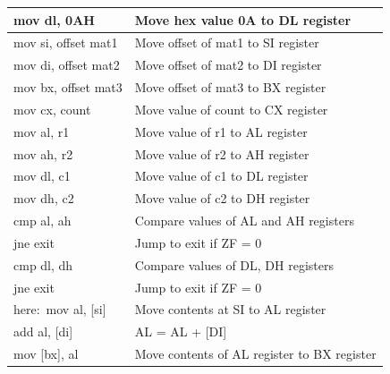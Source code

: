 \documentclass[10pt,a4paper]{article}
\begin{document}
\begin{flushleft}
\begin{table}[htb]
{\begin{tabular}{|l|l|}
\hline
mov dl, 0AH                                                      & Move hex value 0A to DL register              \\
\hline
mov si, offset mat1                                              & Move offset of mat1 to SI register            \\
\hline
mov di, offset mat2                                              & Move offset of mat2 to DI register            \\
\hline
mov bx, offset mat3                                              & Move offset of mat3 to BX register            \\
\hline
mov cx, count                                                    & Move value of count to CX register            \\
\hline
mov al, r1                                                       & Move value of r1 to AL register               \\
\hline
mov ah, r2                                                       & Move value of r2 to AH register               \\
\hline
mov dl, c1                                                       & Move value of c1 to DL register               \\
\hline
mov dh, c2                                                       & Move value of c2 to DH register               \\ 
\hline
cmp al, ah                                                       & Compare values of AL and AH registers         \\
\hline
jne exit                                                         & Jump to exit if ZF = 0                        \\
\hline
cmp dl, dh                                                       & Compare values of DL, DH registers            \\
\hline
jne exit                                                         & Jump to exit if ZF = 0                        \\
\hline
here:~mov al, [si]                                               & Move contents at SI to AL register            \\
\hline            
add al, [di]                                                     & AL = AL + [DI]                                \\
\hline
mov [bx], al                                                     & Move contents of AL register to BX register   \\

\end{tabular}}
\end{table}
\end{flushleft}
\end{document}

